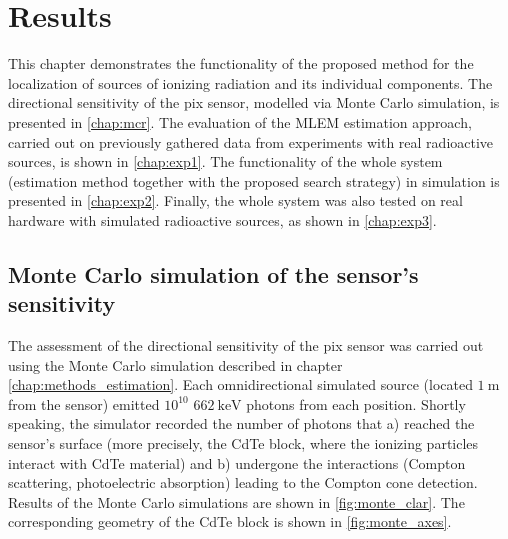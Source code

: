 
\chapter{Results\label{chap:results}}
This chapter demonstrates the functionality of the proposed method for the localization of sources of ionizing radiation and its individual components.
The directional sensitivity of the \ac{pix} sensor, modelled via Monte Carlo simulation, is presented in \autoref{chap:mcr}.
The evaluation of the \ac{MLEM} estimation approach, carried out on previously gathered data from experiments with real radioactive sources, is shown in \autoref{chap:exp1}.
The functionality of the whole system (estimation method together with the proposed search strategy) in simulation is presented in \autoref{chap:exp2}.
Finally, the whole system was also tested on real hardware with simulated radioactive sources, as shown in \autoref{chap:exp3}.

\section{Monte Carlo simulation of the sensor's sensitivity\label{chap:mcr}}
The assessment of the directional sensitivity of the \ac{pix} sensor was carried out using the Monte Carlo simulation described in chapter \autoref{chap:methods_estimation}.
Each omnidirectional simulated source (located $\SI{1}{\meter}$ from the sensor) emitted $10^{10}$ $\SI{662}{\kilo\electronvolt}$ photons from each position.
Shortly speaking, the simulator recorded the number of photons that a) reached the sensor's surface (more precisely, the \ac{CdTe} block, where the ionizing particles interact with \ac{CdTe} material) and b) undergone the interactions (Compton scattering, photoelectric absorption) leading to the Compton cone detection.  
Results of the Monte Carlo simulations are shown in \autoref{fig:monte_clar}.
The corresponding geometry of the \ac{CdTe} block is shown in \autoref{fig:monte_axes}.

